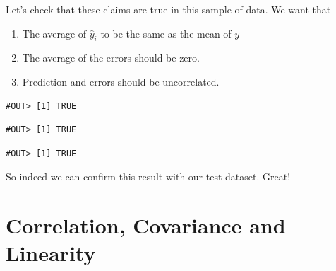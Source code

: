 \documentclass[]{book}
\newenvironment{Shaded}{\begin{snugshade}}{\end{snugshade}}
\newcommand{\CommentTok}[1]{\textcolor[rgb]{0.56,0.35,0.01}{\textit{#1}}}
\newcommand{\DecValTok}[1]{\textcolor[rgb]{0.00,0.00,0.81}{#1}}
\newcommand{\KeywordTok}[1]{\textcolor[rgb]{0.13,0.29,0.53}{\textbf{#1}}}
\newcommand{\NormalTok}[1]{#1}
\newcommand{\OperatorTok}[1]{\textcolor[rgb]{0.81,0.36,0.00}{\textbf{#1}}}
\providecommand{\tightlist}{%
  \setlength{\itemsep}{0pt}\setlength{\parskip}{0pt}}
\begin{document}
Let's check that these claims are true in this sample of data. We want that

\begin{enumerate}
\def\labelenumi{\arabic{enumi}.}
\tightlist
\item
  The average of \(\hat{y}_i\) to be the same as the mean of \(y\)
\item
  The average of the errors should be zero.
\item
  Prediction and errors should be uncorrelated.
\end{enumerate}

\begin{Shaded}
\end{Shaded}

\begin{verbatim}
#OUT> [1] TRUE
\end{verbatim}

\begin{Shaded}
\end{Shaded}

\begin{verbatim}
#OUT> [1] TRUE
\end{verbatim}

\begin{Shaded}
\end{Shaded}

\begin{verbatim}
#OUT> [1] TRUE
\end{verbatim}

So indeed we can confirm this result with our test dataset. Great!

\hypertarget{correlation-covariance-and-linearity}{%
\section{Correlation, Covariance and Linearity}\label{correlation-covariance-and-linearity}}
\end{document}

